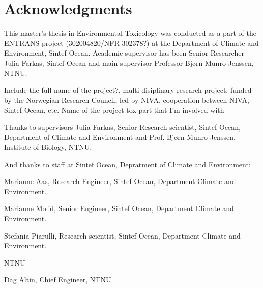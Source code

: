 \chapter*{Acknowledgments}
This master's thesis in Environmental Toxicology was conducted as a part of the ENTRANS project (302004820/NFR 302378?) at the Department of Climate and Environment, Sintef Ocean. Academic supervisor has been Senior Researcher Julia Farkas, Sintef Ocean and main supervisor Professor Bjørn Munro Jenssen, NTNU.

Include the full name of the project?, multi-disiplinary research project, funded by the Norwegian Research Council, led by NIVA, cooperation between NIVA, Sintef Ocean, etc.
Name of the project tox part that I'm involved with

Thanks to supervisors
Julia Farkas, Senior Research scientist, Sintef Ocean, Department of Climate and Environment
and
Prof. Bjørn Munro Jenssen, Institute of Biology, NTNU.

And thanks to staff at Sintef Ocean, Depratment of Climate and Environment:

Marianne Aas, Research Engineer,  Sintef Ocean, Department Climate and Environment.

Marianne Molid, Senior Engineer, Sintef Ocean, Department Climate and Environment.

Stefania Piarulli, Research scientist, Sintef Ocean, Department Climate and Environment.

NTNU

Dag Altin, Chief Engineer, NTNU.


